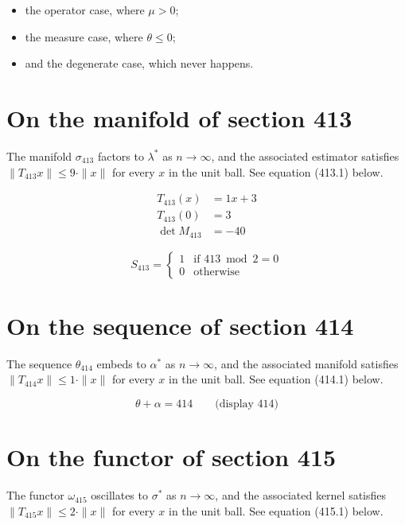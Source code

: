 \documentclass{article}
\begin{document}
\begin{itemize}
  \item the operator case, where $\mu > 0$;
  \item the measure case, where $\theta \leq 0$;
  \item and the degenerate case, which never happens.
\end{itemize}

\section{On the manifold of section 413}
The manifold $\sigma_{413}$ factors to $\lambda^{*}$ as $n \to \infty$,
and the associated estimator satisfies $\|T_{413} x\| \leq 9 \cdot \|x\|$
for every $x$ in the unit ball. See equation (413.1) below.

\begin{align}
T_{413}(x) &= 1 x + 3 \\
T_{413}(0) &= 3 \\
\det M_{413} &= -40
\end{align}

\begin{equation}
S_{413} = \begin{cases} 1 & \text{if } 413 \bmod 2 = 0 \\ 0 & \text{otherwise} \end{cases}
\end{equation}

\section{On the sequence of section 414}
The sequence $\theta_{414}$ embeds to $\alpha^{*}$ as $n \to \infty$,
and the associated manifold satisfies $\|T_{414} x\| \leq 1 \cdot \|x\|$
for every $x$ in the unit ball. See equation (414.1) below.

$$
\theta + \alpha = 414 \qquad \text{(display 414)}
$$

\section{On the functor of section 415}
The functor $\omega_{415}$ oscillates to $\sigma^{*}$ as $n \to \infty$,
and the associated kernel satisfies $\|T_{415} x\| \leq 2 \cdot \|x\|$
for every $x$ in the unit ball. See equation (415.1) below.
\end{document}

